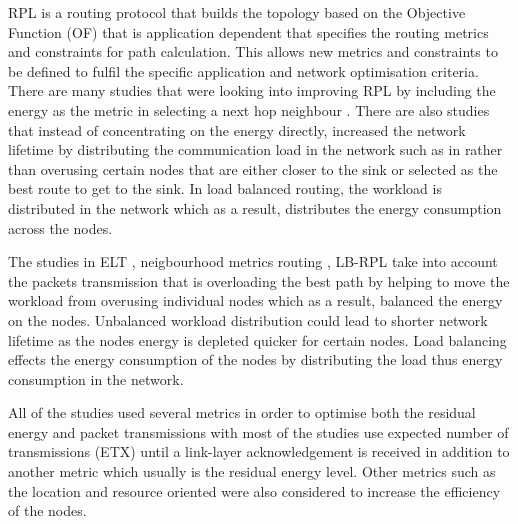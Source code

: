
RPL is a routing protocol that builds the topology based on the Objective Function (OF) that is application dependent that specifies the routing metrics and constraints for path calculation.
This allows new metrics and constraints to be defined to fulfil the specific application and network optimisation criteria. 
There are many studies that were looking into improving RPL by including the energy as the metric in selecting a next hop neighbour \cite{energyrpl, energyLHC, elt, customOF, roee, compositeMetric, caof}.
There are also studies that instead of concentrating on the energy directly, increased the network lifetime by distributing the communication load in the network such as in \cite{loadbalance, spreadload} rather than overusing certain nodes that are either closer to the sink or selected as the best route to get to the sink.
In load balanced routing, the workload is distributed in the network which as a result, distributes the energy consumption across the nodes. 

The studies in ELT \cite{elt}, neigbourhood metrics routing \cite{spreadload}, LB-RPL \cite{loadbalance} take into account the packets transmission that is overloading the best path by helping to move the workload from overusing individual nodes which as a result, balanced the energy on the nodes. Unbalanced workload distribution could lead to shorter network lifetime as the nodes energy is depleted quicker for certain nodes. Load balancing effects the energy consumption of the nodes by distributing the load thus energy consumption in the network.

All of the studies used several metrics in order to optimise both the residual energy and packet transmissions with most of the studies use expected number of transmissions (ETX) until a link-layer acknowledgement is received in addition to another metric which usually is the residual energy level. Other metrics such as the location and resource oriented were also considered to increase the efficiency of the nodes.

